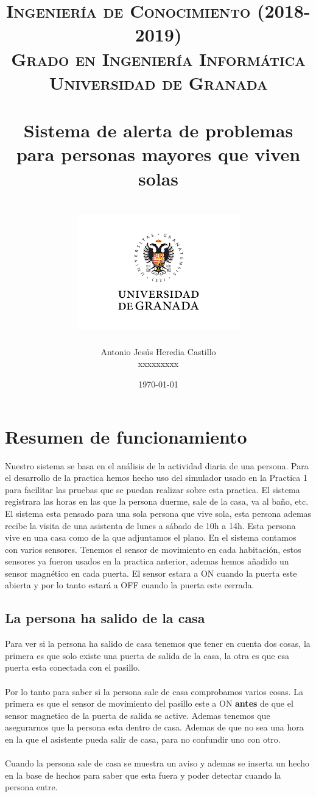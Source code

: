 \documentclass[12pt,a4paper]{article}
\title{
\normalfont \normalsize 
\textsc{{\bf Ingeniería de Conocimiento (2018-2019)} \\ Grado en Ingeniería Informática \\ Universidad de Granada} \\ [25pt] %
\horrule{0.5pt} \\[0.4cm] %
\huge Sistema de alerta de problemas para personas mayores que viven solas \\ %
\horrule{2pt} \\[0.5cm] %
\includegraphics{images/logo.png}	
}
\author{Antonio Jesús Heredia Castillo\\xxxxxxxxx} %
\date{\normalsize\today} %
\begin{document}
\maketitle %
\newpage %
\tableofcontents %
\newpage

\section{Resumen de funcionamiento}
Nuestro sistema se basa en el análisis de la actividad diaria de una persona. Para el desarrollo de la practica hemos hecho uso del simulador usado en la Practica 1 para facilitar las pruebas que se puedan realizar sobre esta practica. El sistema registrara las horas en las que la persona duerme, sale de la casa, va al baño, etc.  El sistema esta pensado para una sola persona que vive sola, esta persona ademas recibe la visita de una asistenta de lunes a sábado de 10h a 14h. Esta persona vive en una casa como de la que adjuntamos el plano. En el sistema contamos con varios sensores. Tenemos el sensor de movimiento en cada habitación, estos sensores ya fueron usados en la practica anterior, ademas hemos añadido un sensor magnético en cada puerta. El sensor estara a ON cuando la puerta este abierta y por lo tanto estará a OFF cuando la puerta este cerrada. 
\subsection{La persona ha salido de la casa}
Para ver si la persona ha salido de casa tenemos que tener en cuenta dos cosas, la primera es que solo existe una puerta de salida de la casa, la otra es que esa puerta esta conectada con el pasillo. \\\\
Por lo tanto para saber si la persona sale de casa comprobamos varios cosas. La primera es que el sensor de movimiento del pasillo este a ON \textbf{antes} de que el sensor magnetico de la puerta de salida se active. Ademas tenemos que asegurarnos que la persona esta dentro de casa. Ademas de que no sea una hora en la que el asistente pueda salir de casa, para no confundir uno con otro. \\\\

Cuando la persona sale de casa se muestra un aviso y ademas se inserta un hecho en la base de hechos para saber que esta fuera y poder detectar cuando la persona entre.
\end{document}
